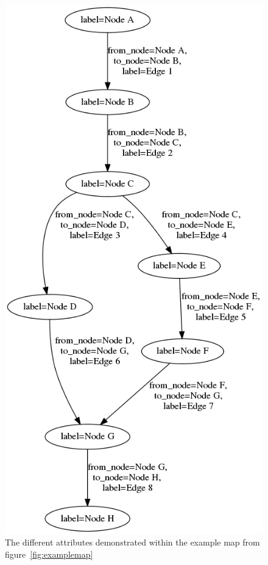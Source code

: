\begin{figure}
\centering
    \includegraphics[height=.6\textheight]{img/examplemap_objects.png}
    \caption{The different attributes demonstrated within the example map from figure~\protect\ref{fig:examplemap}}
    \label{fig:examplemap_objects}
\end{figure}

